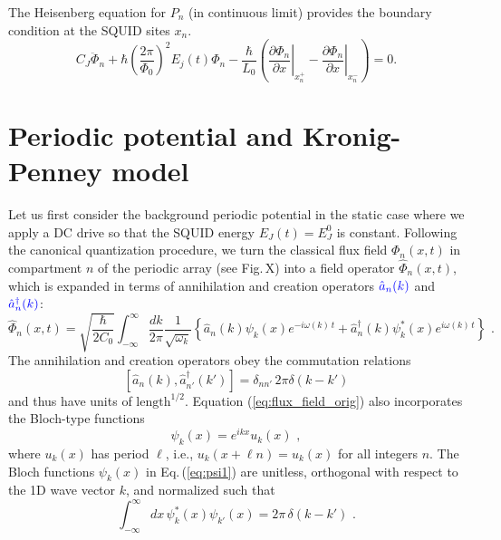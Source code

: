 The Heisenberg equation for $P_n$ (in continuous limit) provides the boundary condition at the SQUID sites $x_n$.
\begin{equation}\label{eq:BC_field}
C_{J} \ddot{\Phi}_{n}+\hbar\left(\frac{2 \pi}{\Phi_{0}}\right)^{2} E_{j}(t) \Phi_{n} -\frac{\hbar}{L_{0}}\left(\left.\frac{\partial \Phi_{n}}{\partial x}\right|_{x_n^{+}}-\left.\frac{\partial \Phi_{n}}{\partial x}\right|_{x_n^{-}}\right)=0.
\end{equation}

\section{Periodic potential and Kronig-Penney model}\label{sec:Kronig-Penney}
%
\noindent
Let us first consider the background periodic potential in the static case where we apply a DC drive so that the SQUID energy $E_J(t) = E_J^0$ is constant. Following the canonical quantization procedure, 
\color{blue} we turn the classical flux field ${\Phi}_n(x,t)$ 
in compartment $n$ of the periodic array \color{red} (see Fig.\,X) \color{blue}
into a field operator $\hat{\Phi}_n(x,t)$, which is expanded in terms of 
annihilation and creation operators $\color{blue} \hat{a}_n(k)$ and 
$\color{blue} {\hat a}_n^\dagger(k)$:
%
\begin{equation} \label{eq:flux_field_orig}
    \hat{\Phi}_n(x,t) = \sqrt{\frac{\hbar}{2 C_0}} 
    \int_{-\infty}^{\infty}\frac{dk}{2 \pi} \frac{1}{\sqrt{\omega_k}}
    \left\{ \hat{a}_n(k) \psi_k(x)e^{-i \omega(k) \, t} + 
    \hat{a}_n^{\dagger}(k) \psi_k^*(x) e^{i \omega(k) \, t} \right\} \, \, .
\end{equation}
%
The annihilation and creation operators obey the commutation relations
%
\begin{equation} \label{eq:cra_orig}
    \left[ \hat{a}_n(k),{\hat a}_{n'}^\dagger(k') \right] = \delta_{nn'} \, 2 \pi \delta(k - k')
\end{equation}
%
and thus have units of $\text{length}^{1/2}$.
Equation (\ref{eq:flux_field_orig}) also incorporates the Bloch-type functions 
%
\begin{equation} \label{eq:psi1}
\psi_k(x) = e^{i k x} u_k(x) \, \, ,   
\end{equation}
%
where $u_k(x)$ has period $\ell$, i.e., $u_k(x + \ell n) = u_k(x)$ for all integers $n$.
The Bloch functions $\psi_k(x)$ in Eq.\,(\ref{eq:psi1}) are unitless, orthogonal with respect to 
the 1D wave vector $k$, and normalized such that
%
\begin{equation} \label{eq:psi1_norm_orig}
\int_{-\infty}^{\infty} dx \, \psi^*_k(x) \psi_{k'}(x) = 2 \pi \, \delta(k - k') \, \, .
\end{equation}
